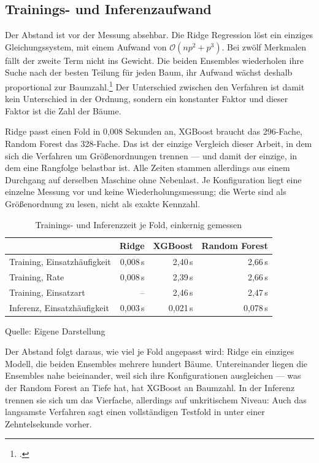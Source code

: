 \documentclass[12pt,a4paper]{article}
\renewcommand{\footnotesize}{\fontsize{10pt}{12pt}\selectfont}
\newcommand{\tabformat}{%
  \centering
  \singlespacing
  \footnotesize
  \setlength{\tabcolsep}{5pt}%
  \renewcommand{\arraystretch}{1.15}%
}
\newcommand{\tabquelle}[1][Eigene Darstellung]{%
  \par\setlength{\parskip}{0pt}\vspace{3pt}%
  {\setstretch{1}\fontsize{9pt}{11pt}\selectfont\raggedright Quelle: #1\par}%
}
\begin{document}
\subsection{Trainings- und Inferenzaufwand}
\label{sec:aufwand}

Der Abstand ist vor der Messung absehbar. Die Ridge Regression löst ein einziges
Gleichungssystem, mit einem Aufwand von $\mathcal{O}(np^{2} + p^{3})$. Bei zwölf
Merkmalen fällt der zweite Term nicht ins Gewicht. Die beiden Ensembles wiederholen ihre
Suche nach der besten Teilung für jeden Baum, ihr Aufwand wächst deshalb proportional
zur Baumzahl.\footcite[790]{Chen2016} Der Unterschied zwischen den Verfahren ist damit
kein Unterschied in der Ordnung, sondern ein konstanter Faktor und dieser Faktor ist
die Zahl der Bäume.

Ridge passt einen Fold in 0,008 Sekunden an, XGBoost braucht das 296-Fache, Random Forest das 328-Fache. Das ist der einzige Vergleich dieser Arbeit, in dem sich die Verfahren um Größenordnungen trennen --- und damit der einzige, in dem eine Rangfolge belastbar ist. Alle Zeiten stammen allerdings aus einem Durchgang auf derselben Maschine ohne Nebenlast. Je Konfiguration liegt eine einzelne Messung vor und keine Wiederholungsmessung; die Werte sind als Größenordnung zu lesen, nicht als exakte Kennzahl.
 
\begin{table}[htbp]
    \tabformat
    \caption{Trainings- und Inferenzzeit je Fold, einkernig gemessen}
    \label{tab:aufwand_zeit}
    \begin{tabularx}{\textwidth}{@{}Y r r r@{}}
        \toprule
        & \textbf{Ridge} & \textbf{XGBoost} & \textbf{Random Forest} \\
        \midrule
        Training, Einsatzhäufigkeit & 0,008\,s & 2,40\,s  & 2,66\,s \\
        Training, Rate              & 0,008\,s & 2,39\,s  & 2,66\,s \\
        Training, Einsatzart        & --       & 2,46\,s  & 2,47\,s \\
        \addlinespace
        Inferenz, Einsatzhäufigkeit & 0,003\,s & 0,021\,s & 0,078\,s \\
        \bottomrule
    \end{tabularx}
    \tabquelle
\end{table}
 
Der Abstand folgt daraus, wie viel je Fold angepasst wird: Ridge ein einziges Modell, die beiden Ensembles mehrere hundert Bäume. Untereinander liegen die Ensembles nahe beieinander, weil sich ihre Konfigurationen ausgleichen --- was der Random Forest an Tiefe hat, hat XGBoost an Baumzahl. In der Inferenz trennen sie sich um das Vierfache, allerdings auf unkritischem Niveau: Auch das langsamste Verfahren sagt einen vollständigen Testfold in unter einer Zehntelsekunde vorher.
 
\end{document}
